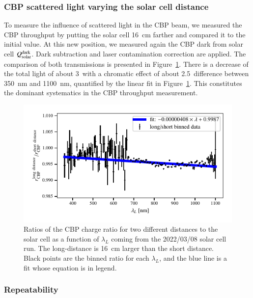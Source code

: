 \subsubsection{CBP scattered light varying the solar cell distance}

To measure the influence of scattered light in the CBP beam, we measured the CBP throughput by putting the solar cell \SI{16}{\cm} farther and compared it to the initial value. At this new position, we measured again the CBP dark from solar cell $Q_{\mathrm{solar}}^{\rm dark}$. Dark subtraction and laser contamination correction are applied. The comparison of both transmissions is presented in Figure~\ref{fig:sc_distance}. There is a decrease of the total light of about 3\textperthousand\ with a chromatic effect of about 2.5\textperthousand\ difference between \SI{350}{\nano\meter} and \SI{1100}{\nano\meter}, quantified by the linear fit in Figure~\ref{fig:sc_distance}. This constitutes the dominant systematics in the CBP throughput measurement.

\begin{figure}[h]
    \centering
    \includegraphics[width=\columnwidth]{fig/sc_distance.pdf}
    \caption{Ratios of the CBP charge ratio for two different distances to the solar cell as a function of $\lambda_L$ coming from the 2022/03/08 solar cell run. The long-distance is \SI{16}{\cm} larger than the short distance. Black points are the binned ratio for each $\lambda_L$, and the blue line is a fit whose equation is in legend.}
    \label{fig:sc_distance}
\end{figure}

\subsubsection{Repeatability}

